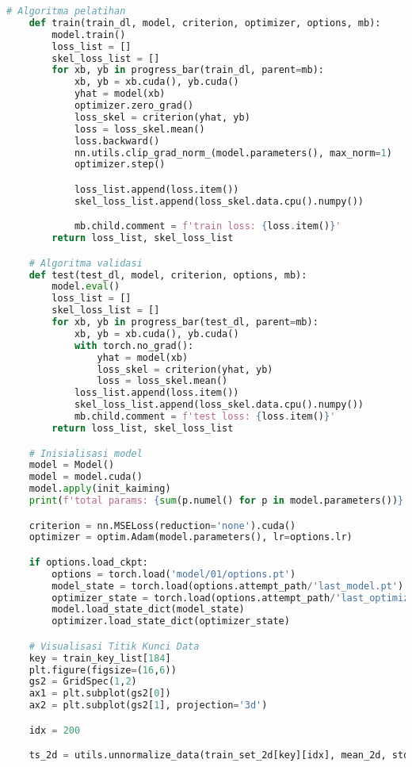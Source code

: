 \begin{lstlisting}[language=Python,multicols=2,basicstyle=\tiny,breaklines=true]
    # Algoritma pelatihan
    def train(train_dl, model, criterion, optimizer, options, mb):
        model.train()
        loss_list = []
        skel_loss_list = []
        for xb, yb in progress_bar(train_dl, parent=mb):
            xb, yb = xb.cuda(), yb.cuda()
            yhat = model(xb)
            optimizer.zero_grad()
            loss_skel = criterion(yhat, yb)
            loss = loss_skel.mean()
            loss.backward()
            nn.utils.clip_grad_norm_(model.parameters(), max_norm=1)
            optimizer.step()

            loss_list.append(loss.item())
            skel_loss_list.append(loss_skel.data.cpu().numpy())

            mb.child.comment = f'train loss: {loss.item()}'
        return loss_list, skel_loss_list

    # Algoritma validasi
    def test(test_dl, model, criterion, options, mb):
        model.eval()
        loss_list = []
        skel_loss_list = []
        for xb, yb in progress_bar(test_dl, parent=mb):
            xb, yb = xb.cuda(), yb.cuda()
            with torch.no_grad():
                yhat = model(xb)
                loss_skel = criterion(yhat, yb)
                loss = loss_skel.mean()
            loss_list.append(loss.item())
            skel_loss_list.append(loss_skel.data.cpu().numpy())
            mb.child.comment = f'test loss: {loss.item()}'
        return loss_list, skel_loss_list

    # Inisialisasi model
    model = Model()
    model = model.cuda()
    model.apply(init_kaiming)
    print(f'total params: {sum(p.numel() for p in model.parameters())}')

    criterion = nn.MSELoss(reduction='none').cuda()
    optimizer = optim.Adam(model.parameters(), lr=options.lr)

    if options.load_ckpt:
        options = torch.load('model/01/options.pt')
        model_state = torch.load(options.attempt_path/'last_model.pt')
        optimizer_state = torch.load(options.attempt_path/'last_optimizer.pt')
        model.load_state_dict(model_state)
        optimizer.load_state_dict(optimizer_state)

    # Visualisasi Titik Kunci Data
    key = train_key_list[184]
    plt.figure(figsize=(16,6))
    gs2 = GridSpec(1,2)
    ax1 = plt.subplot(gs2[0])
    ax2 = plt.subplot(gs2[1], projection='3d')

    idx = 200

    ts_2d = utils.unnormalize_data(train_set_2d[key][idx], mean_2d, std_2d, dim_ignore_2d)[0]


\end{lstlisting}
